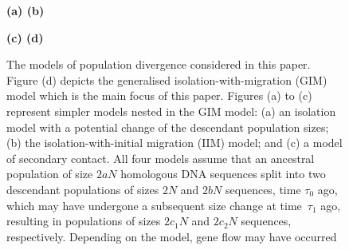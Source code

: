 \documentclass[11pt]{article}
\begin{document}

\begin{figure}[!bth]
\textbf{\hspace*{-0.5cm} (a) \hspace*{7cm} (b)}\par\smallskip
\vspace*{-0.5cm}
\hspace*{1.5cm}
\par
\vspace*{-1cm}
\textbf{\hspace*{-0.5cm} (c) \hspace*{7cm} (d)}\par\smallskip
\vspace*{-0.5cm}
\hspace*{1.5cm}
\vspace*{-2cm}
\caption{The models of population divergence considered in this paper. Figure (d) depicts the generalised isolation-with-migration (GIM) model which is the main focus of this paper. Figures (a) to (c) represent simpler models nested in the GIM model: (a) an isolation model with a potential change of the descendant population sizes; (b) the isolation-with-initial migration (IIM) model; and (c) a model of secondary contact. All four models assume that an ancestral population of size $2aN$ homologous DNA sequences split into two descendant populations of sizes $2N$ and $2bN$ sequences, time $\tau_0$ ago, which may have undergone a subsequent size change at time~$\tau_1$ ago, resulting in populations of sizes $2c_1N$ and $2c_2N$ sequences, respectively. Depending on the model, gene flow may have occurred 
}
\end{figure}
\end{document}
